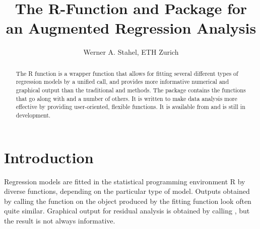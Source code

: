 \documentclass[11pt]{article}\usepackage[]{graphicx}\usepackage[]{color}
\makeatletter
\newenvironment{kframe}{%
 \def\at@end@of@kframe{}%
 \ifinner\ifhmode%
  \def\at@end@of@kframe{\end{minipage}}%
  \begin{minipage}{\columnwidth}%
 \fi\fi%
 \def\FrameCommand##1{\hskip\@totalleftmargin \hskip-\fboxsep
 \colorbox{shadecolor}{##1}\hskip-\fboxsep
     \hskip-\linewidth \hskip-\@totalleftmargin \hskip\columnwidth}%
 \MakeFramed {\advance\hsize-\width
   \@totalleftmargin\z@ \linewidth\hsize
   \@setminipage}}%
 {\par\unskip\endMakeFramed%
 \at@end@of@kframe}
\newenvironment{knitrout}{}{} %
\makeatother
\begin{document}
\baselineskip 15pt

\title{\vspace*{-10mm}
The R-Function  and Package  for an Augmented 
Regression Analysis}
\author{Werner A. Stahel, ETH Zurich}
\maketitle

\begin{abstract}\noindent
The R function  is a wrapper function that allows for fitting
several different types of regression models by a unified call, and
provides more informative numerical and graphical output than the 
traditional  and  methods.
The package  contains the functions that go along with 
 and a number of others.
It is written to make data analysis more effective by providing
user-oriented, flexible functions.
It is available from  and is still in development.
\end{abstract}

\begin{knitrout}
\color{fgcolor}\begin{kframe}


{\ttfamily\noindent\itshape\color{messagecolor}{\#\# \\\#\# Attaching package: 'regr0'}}

{\ttfamily\noindent\itshape\color{messagecolor}{\#\# The following object is masked from 'package:stats':\\\#\# \\\#\#\ \ \ \  step}}

{\ttfamily\noindent\itshape\color{messagecolor}{\#\# The following object is masked from 'package:base':\\\#\# \\\#\#\ \ \ \  subset}}\end{kframe}
\end{knitrout}
\section{Introduction}

Regression models are fitted in the statistical programming environment R 
by diverse functions, depending on the particular type of model.
Outputs obtained by calling the function  on the object produced
by the fitting function look often quite similar. Graphical output for
residual analysis is obtained by calling , but the result is not
always informative. 
\end{document}
